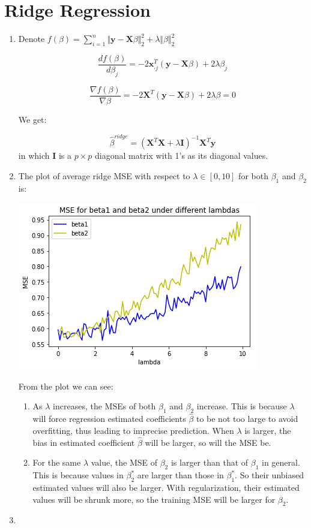 \documentclass[paper=letter, fontsize=12pt]{article}
\begin{document}
\section{Ridge Regression}

\begin{enumerate}[label=(\alph*)]
	\item Denote $f(\beta) = \sum_{i = 1}^{n} \Vert \boldsymbol{y} - \boldsymbol{X} \beta \Vert_2^2 + \lambda \Vert \beta \Vert_2^2$
	
	$$\frac{d f(\beta)}{d \beta_j} = -2 \boldsymbol{x}_{\cdot j}^T (\boldsymbol{y} - \boldsymbol{X} \beta ) + 2 \lambda \beta_j$$
	
	$$\frac{\nabla f(\beta)}{\nabla \beta} = -2 \boldsymbol{X}^T (\boldsymbol{y} - \boldsymbol{X} \beta) + 2 \lambda \beta = 0$$
	
	We get:
	
	$$\hat{\beta}^{ridge} = (\boldsymbol{X}^T \boldsymbol{X} + \lambda \boldsymbol{I})^{-1} \boldsymbol{X}^T \boldsymbol{y}$$ in which $\boldsymbol{I}$ is a $p \times p$ diagonal matrix with 1's as its diagonal values.
	
	\item The plot of average ridge MSE with respect to $\lambda \in [0, 10]$ for both $\beta_1$ and $\beta_2$ is:
	
	\includegraphics[scale=0.6]{q3b.png}
	
	From the plot we can see:
	
	\begin{enumerate}[label=(\arabic*)]
		\item As $\lambda$ increases, the MSEs of both $\beta_1$ and $\beta_2$ increase. This is because $\lambda$ will force regression estimated coefficients $\hat{\beta}$ to be not too large to avoid overfitting, thus leading to imprecise prediction. When $\lambda$ is larger, the bias in estimated coefficient $\hat{\beta}$ will be larger, so will the MSE be.
		
		\item For the same $\lambda$ value, the MSE of $\beta_2$ is larger than that of $\beta_1$ in general. This is because values in $\beta_2^*$ are larger than those in $\beta_1^*$. So their unbiased estimated values will also be larger. With regularization, their estimated values will be shrunk more, so the training MSE will be larger for $\beta_2$.
	\end{enumerate}
	
	\item   
\end{enumerate}
\end{document}
